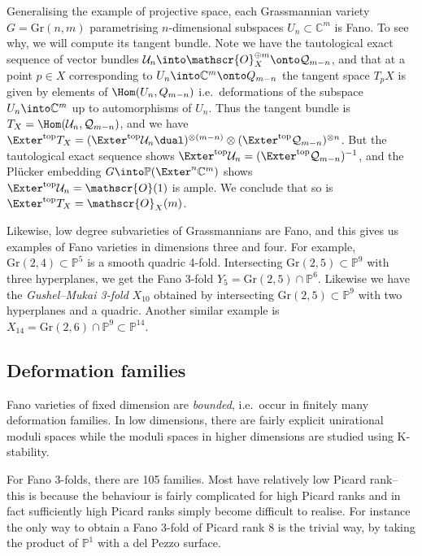 \begin{example}[Grassmannians]
    Generalising the example of projective space, each Grassmannian variety
    \(G=\text{Gr}(n,m)\) parametrising \(n\)-dimensional subspaces \(U_n\subset
    \mathbb{C}^m\) is Fano. To see why, we will compute its tangent bundle. Note
    we have the tautological exact sequence of vector bundles
    \(\mathcal{U}_n\into \mathscr{O}_X^{\oplus m}\onto \mathcal{Q}_{m-n}\), and
    that at a point \(p\in X\) corresponding to \(U_n\into \mathbb{C}^m\onto
    Q_{m-n}\) the tangent space \(T_pX\) is given by elements of \(\Hom(U_n,
    Q_{m-n})\) i.e.\ deformations of the subspace \(U_n\into \mathbb{C}^m\) up
    to automorphisms of \(U_n\). Thus the tangent bundle is
    \(T_X=\Hom(\mathcal{U}_n, \mathcal{Q}_{m-n})\), and we have
    \(\Exter^\text{top} T_X= (\Exter^\text{top} \mathcal{U}_n\dual)^{\otimes
    (m-n)}\otimes (\Exter^\text{top}\mathcal{Q}_{m-n})^{\otimes n}\). But the
    tautological exact sequence shows \(\Exter^\text{top}\mathcal{U}_n =
    (\Exter^\text{top}\mathcal{Q}_{m-n})^{-1}\), and the Pl\"ucker embedding
    \(G\into \mathbb{P}(\Exter^n \mathbb{C}^m)\) shows
    \(\Exter^\text{top}\mathcal{U}_n = \mathscr{O}(1)\) is ample. We conclude
    that so is \(\Exter^\text{top}T_X = \mathscr{O}_X(m)\).
\end{example}

Likewise, low degree subvarieties of Grassmannians are Fano, and this gives us
examples of Fano varieties in dimensions three and four. For example,
\(\text{Gr}(2,4)\subset \mathbb{P}^5\) is a smooth quadric 4-fold. Intersecting
\(\text{Gr}(2,5)\subset \mathbb{P}^9\) with three hyperplanes, we get the Fano 3-fold \(Y_5=\text{Gr}(2,5)\cap \mathbb{P}^6\). Likewise we have the
\textit{Gushel--Mukai 3-fold} \(X_{10}\) obtained by intersecting
\(\text{Gr}(2,5)\subset \mathbb{P}^9\) with two hyperplanes and a quadric.
Another similar example is \(X_{14}=\text{Gr}(2,6)\cap \mathbb{P}^9\subset
\mathbb{P}^{14}\).

\subsection{Deformation families}
Fano varieties of fixed dimension are \textit{bounded}, i.e.\ occur in
finitely many deformation families. In low dimensions, there are fairly explicit
unirational moduli spaces while the moduli spaces in higher dimensions are
studied using K-stability.

For Fano 3-folds, there are 105 families. Most have relatively low Picard rank--
this is because the behaviour is fairly complicated for high Picard ranks and in
fact sufficiently high Picard ranks simply become difficult to realise. For
instance the only way to obtain a Fano 3-fold of Picard rank \(8\) is the
trivial way, by taking the product of \(\mathbb{P}^1\) with a del Pezzo surface.

